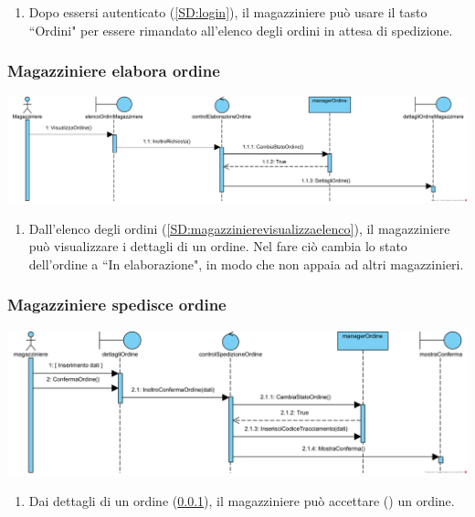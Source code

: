 \documentclass[12pt]{article}
\begin{document}
\begin{enumerate}
\item Dopo essersi autenticato (\ref{SD:login}), il magazziniere può usare il tasto ``Ordini" per essere rimandato all'elenco degli ordini in attesa di spedizione.
\end{enumerate}

\subsubsection{Magazziniere elabora ordine}
\label{SD:magazziniereblocca}
\begin{center}
\includegraphics[width=\textwidth]{SequenceDiagram/MagazziniereOrdineVisualizza}
\end{center}

\begin{enumerate}
\item Dall'elenco degli ordini (\ref{SD:magazzinierevisualizzaelenco}), il magazziniere può visualizzare i dettagli di un ordine. Nel fare ciò cambia lo stato dell'ordine a ``In elaborazione", in modo che non appaia ad altri magazzinieri.
\end{enumerate}

\subsubsection{Magazziniere spedisce ordine}
\label{SD:magazzinierespedisce}
\begin{center}
\includegraphics[width=\textwidth]{SequenceDiagram/MagazziniereOrdineSpedisce}
\end{center}

\begin{enumerate}
\item Dai dettagli di un ordine (\ref{SD:magazziniereblocca}), il magazziniere può accettare (\checkmark) un ordine.
\end{enumerate}
\end{document}

